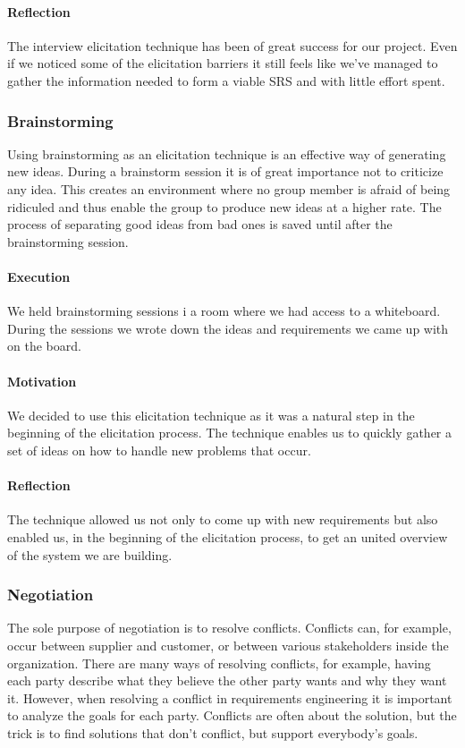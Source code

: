 \documentclass[10pt]{article}
\begin{document}
\paragraph{Reflection}
\hfill \break
The interview elicitation technique has been of great success for our project. Even if we noticed some of the elicitation barriers it still feels like we've managed to gather the information needed to form a viable SRS and with little effort spent.

\subsubsection{Brainstorming}
Using brainstorming as an elicitation technique is an effective way of generating new ideas. During a brainstorm session it is of great importance not to criticize any idea. This creates an environment where no group member is afraid of being ridiculed and thus enable the group to produce new ideas at a higher rate.
The process of separating good ideas from bad ones is saved until after the brainstorming session.
\paragraph{Execution}
\hfill \break
We held brainstorming sessions i a room where we had access to a whiteboard. During the sessions we wrote down the ideas and requirements we came up with on the board.
\paragraph{Motivation}
\hfill \break
We decided to use this elicitation technique as it was a natural step in the beginning of the elicitation process. The technique enables us to quickly gather a set of ideas on how to handle new problems that occur.
\paragraph{Reflection}
\hfill \break
The technique allowed us not only to come up with new requirements but also enabled us, in the beginning of the elicitation process, to get an united overview of the system we are building.

\subsubsection{Negotiation}
The sole purpose of negotiation is to resolve conflicts. Conflicts can, for example, occur between supplier and customer, or between various stakeholders inside the organization. There are many ways of resolving conflicts, for example, having each party describe what they believe the other party wants and why they want it. However, when resolving a conflict in requirements engineering it is important to analyze the goals for each party. Conflicts are often about the solution, but the trick is to find solutions that don’t conflict, but support everybody’s goals.
\end{document}

